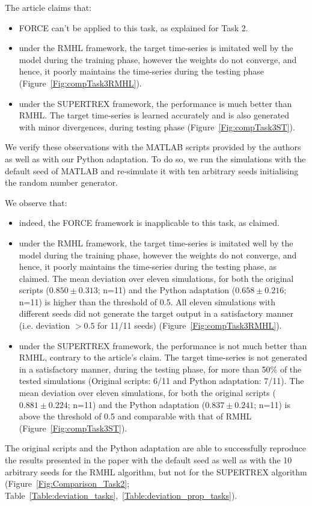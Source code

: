 The article claims that:
\begin{itemize}
    \item FORCE can't be applied to this task, as explained for Task 2.
    \item under the RMHL framework, the target time-series is imitated well by the model during the training phase, however the weights do not converge, and hence, it poorly maintains the time-series during the testing phase (Figure~\ref{Fig:compTask3RMHL}).
    \item under the SUPERTREX framework, the performance is much better than RMHL. The target time-series is learned accurately and is also generated with minor divergences, during testing phase (Figure~\ref{Fig:compTask3ST}).
\end{itemize}

We verify these observations with the MATLAB scripts provided by the authors as well as with our Python adaptation. To do so, we run the simulations with the default seed of MATLAB and re‐simulate it with ten arbitrary seeds initialising the random number generator. 

We observe that:
\begin{itemize}
    \item indeed, the FORCE framework is inapplicable to this task, as claimed.  
    \item under the RMHL framework, the target time-series is imitated well by the model during the training phase, however the weights do not converge, and hence, it poorly maintains the time-series during the testing phase, as claimed. The mean deviation over eleven simulations, for both the original scripts ($0.850\pm0.313$; n=11) and the Python adaptation ($0.658\pm0.216$; n=11) is higher than the threshold of 0.5. All eleven simulations with different seeds did not generate the target output in a satisfactory manner (i.e. deviation $> 0.5$ for 11/11 seeds) (Figure~\ref{Fig:compTask3RMHL}).
    \item under the SUPERTREX framework, the performance is not much better than RMHL, contrary to the article's claim. The target time-series is not generated in a satisfactory manner, during the testing phase, for more than 50\% of the tested simulations (Original scripts: 6/11 and Python adaptation: 7/11). The mean deviation over eleven simulations, for both the original scripts ($0.881\pm0.224$; n=11) and the Python adaptation ($0.837\pm0.241$; n=11) is above the threshold of 0.5 and comparable with that of RMHL (Figure~\ref{Fig:compTask3ST}).
\end{itemize}

The original scripts and the Python adaptation are able to successfully reproduce the results presented in the paper with the default seed as well as with the 10 arbitrary seeds for the RMHL algorithm, but not for the SUPERTREX algorithm (Figure~\ref{Fig:Comparison_Task2}; Table~\ref{Table:deviation_tasks},~\ref{Table:deviation_prop_tasks}).






